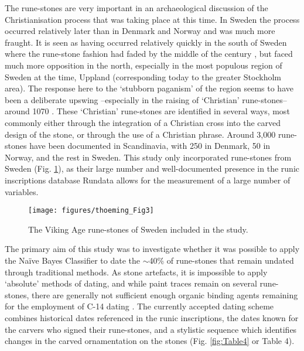 The rune-stones are very important in an archaeological discussion of the Christianisation process that was taking place at this time. In Sweden the process occurred relatively later than in Denmark and Norway and was much more fraught. It is seen as having occurred relatively quickly in the south of Sweden where the rune-stone fashion had faded by the middle of the  century \parencite[501]{Lager_2010}, but faced much more opposition in the north, especially in the most populous region of Sweden at the time, Uppland (corresponding today to the greater Stockholm area). The response here to the ‘stubborn paganism’ of the region \parencite[39]{Herschend_1994} seems to have been a deliberate upswing –especially in the raising of ‘Christian’ rune-stones– around 1070 \parencite[501]{Lager_2010}. These ‘Christian’ rune-stones are identified in several ways, most commonly either through the integration of a Christian cross into the carved design of the stone, or through the use of a Christian phrase. Around 3,000 rune-stones have been documented in Scandinavia, with 250 in Denmark, 50 in Norway, and the rest in Sweden. This study only incorporated rune-stones from Sweden (Fig. \ref{fig:Fig3}), as their large number and well-documented presence in the runic inscriptions database Rundata allows for the measurement of a large number of variables.

\begin{figure}[!htb]
	\texttt{[image: figures/thoeming\_Fig3]}
	\centering
	\caption{The Viking Age rune-stones of Sweden included in the study.}
	\label{fig:Fig3}
\end{figure}


The primary aim of this study was to investigate whether it was possible to apply the Naïve Bayes Classifier to date the $\sim$40\% of rune-stones that remain undated through traditional methods. As stone artefacts, it is impossible to apply ‘absolute’ methods of dating, and while paint traces remain on several rune-stones, there are generally not sufficient enough organic binding agents remaining for the employment of C-14 dating \parencite[22]{Kitzler_2002}. The currently accepted dating scheme combines historical dates referenced in the runic inscriptions, the dates known for the carvers who signed their rune-stones, and a stylistic sequence which identifies changes in the carved ornamentation on the stones \parencite{Gräslund_2006}(Fig. \ref{fig:Table4} or Table 4).

